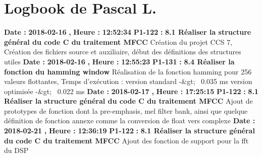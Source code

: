 \documentclass{article}%
\begin{document}
%
\section{Logbook de Pascal L.}%
\textbf{Date : }%
\textbf{2018{-}02{-}16}%
\textbf{,}%
\textbf{ Heure : }%
\textbf{12:52:34}%
\newline%
%
\textbf{P1{-}122 }%
\textbf{ : }%
\textbf{ 8.1 Réaliser la structure général du code C du traitement MFCC}%
\newline%
\newline%
%
Création du projet CCS 7,\newline%
Création des fichiers source et auxiliaire, début des définitions des structures utiles\newline%
\newline%
%
\textbf{Date : }%
\textbf{2018{-}02{-}16}%
\textbf{,}%
\textbf{ Heure : }%
\textbf{12:55:23}%
\newline%
%
\textbf{P1{-}131 }%
\textbf{ : }%
\textbf{ 8.4 Réaliser la fonction du hamming window}%
\newline%
\newline%
%
Réalisation de la fonction hamming pour 256 valeurs flottantes,\newline%
Temps d'exécution :\newline%
version standard {-}\&gt;~ 0.035 ms\newline%
version optimisée {-}\&gt;~ 0.022 ms\newline%
\newline%
%
\textbf{Date : }%
\textbf{2018{-}02{-}17}%
\textbf{,}%
\textbf{ Heure : }%
\textbf{17:25:15}%
\newline%
%
\textbf{P1{-}122 }%
\textbf{ : }%
\textbf{ 8.1 Réaliser la structure général du code C du traitement MFCC}%
\newline%
\newline%
%
Ajout de prototypes de fonction dont la pre{-}emphasis, mel filter bank, ainsi que quelque définition de fonction annexe comme la conversion de float vers complexe\newline%
\newline%
%
\textbf{Date : }%
\textbf{2018{-}02{-}21}%
\textbf{,}%
\textbf{ Heure : }%
\textbf{12:36:19}%
\newline%
%
\textbf{P1{-}122 }%
\textbf{ : }%
\textbf{ 8.1 Réaliser la structure général du code C du traitement MFCC}%
\newline%
\newline%
%
Ajout des fonction de support pour la fft du DSP\newline%
\end{document}
